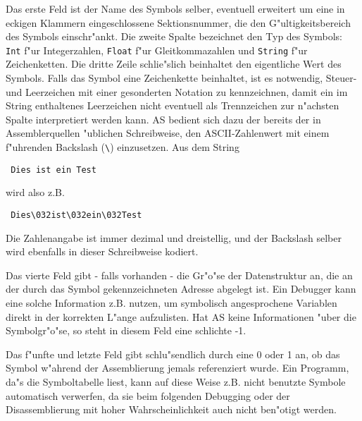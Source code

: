 \documentclass[12pt,a4paper,twoside]{report}
\newcommand{\tty}[1]{{\tt #1}}
\begin{document}
{Das erste Feld ist der Name des Symbols selber, eventuell erweitert
um eine in eckigen Klammern eingeschlossene Sektionsnummer, die den
G"ultigkeitsbereich des Symbols einschr"ankt.  Die zweite Spalte
bezeichnet den Typ des Symbols: \tty{Int} f"ur Integerzahlen, \tty{Float} f"ur
Gleitkommazahlen und \tty{String} f"ur Zeichenketten.  Die dritte Zeile
schlie"slich beinhaltet den eigentliche Wert des Symbols.  Falls das
Symbol eine Zeichenkette beinhaltet, ist es notwendig, Steuer- und
Leerzeichen mit einer gesonderten Notation zu kennzeichnen, damit ein
im String enthaltenes Leerzeichen nicht eventuell als Trennzeichen
zur n"achsten Spalte interpretiert werden kann.  AS bedient sich dazu
der bereits der in Assemblerquellen "ublichen Schreibweise, den
ASCII-Zahlenwert mit einem f"uhrenden Backslash (\verb!\!) einzusetzen.  Aus
dem String
\begin{verbatim}
 Dies ist ein Test
\end{verbatim}
wird also z.B.
\begin{verbatim}
 Dies\032ist\032ein\032Test
\end{verbatim}
Die Zahlenangabe ist immer dezimal und dreistellig, und der Backslash
selber wird ebenfalls in dieser Schreibweise kodiert.

Das vierte Feld gibt - falls vorhanden - die Gr"o"se der Datenstruktur
an, die an der durch das Symbol gekennzeichneten Adresse abgelegt
ist.  Ein Debugger kann eine solche Information z.B. nutzen, um
symbolisch angesprochene Variablen direkt in der korrekten L"ange
aufzulisten.  Hat AS keine Informationen "uber die Symbolgr"o"se, so
steht in diesem Feld eine schlichte -1.

Das f"unfte und letzte Feld gibt schlu"sendlich durch eine 0 oder 1 an,
ob das Symbol w"ahrend der Assemblierung jemals referenziert wurde. 
Ein Programm, da"s die Symboltabelle liest, kann auf diese Weise z.B.
nicht benutzte Symbole automatisch verwerfen, da sie beim folgenden
Debugging oder der Disassemblierung mit hoher Wahrscheinlichkeit auch
nicht ben"otigt werden.

}
\end{document}
